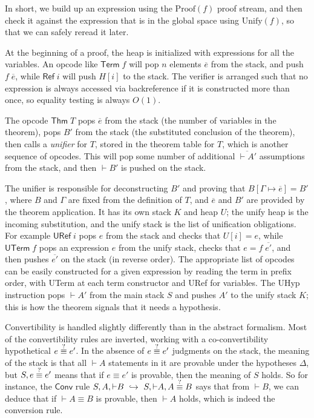 \documentclass[runningheads]{llncs}
\newcommand{\hto}{\hookrightarrow}
\newcommand{\coconv}{\mathrel{\smash{\overset{?}{\equiv}}}}
\begin{document}
In short, we build up an expression using the $\mathrm{Proof}(f)$ proof stream, and then check it against the expression that is in the global space using $\mathrm{Unify}(f)$, so that we can safely reread it later.

At the beginning of a proof, the heap is initialized with expressions for all the variables. An opcode like $\mathsf{Term}\;f$ will pop $n$ elements $\overline{e}$ from the stack, and push $f\;\overline{e}$, while $\mathsf{Ref}\;i$ will push $H[i]$ to the stack. The verifier is arranged such that no expression is always accessed via backreference if it is constructed more than once, so equality testing is always $O(1)$.

The opcode $\mathsf{Thm}\;T$ pops $\overline{e}$ from the stack (the number of variables in the theorem), pops $B'$ from the stack (the substituted conclusion of the theorem), then calls a \emph{unifier} for $T$, stored in the theorem table for $T$, which is another sequence of opcodes. This will pop some number of additional $\overline{\vdash A'}$ assumptions from the stack, and then $\vdash B'$ is pushed on the stack.

The unifier is responsible for deconstructing $B'$ and proving that $B[\Gamma\mapsto \overline{e}]=B'$, where $B$ and $\Gamma$ are fixed from the definition of $T$, and $\overline{e}$ and $B'$ are provided by the theorem application. It has its own stack $K$ and heap $U$; the unify heap is the incoming substitution, and the unify stack is the list of unification obligations. For example $\mathsf{URef}\;i$ pops $e$ from the stack and checks that $U[i]=e$, while $\mathsf{UTerm}\;f$ pops an expression $e$ from the unify stack, checks that $e=f\;\overline{e'}$, and then pushes $\overline{e'}$ on the stack (in reverse order). The appropriate list of opcodes can be easily constructed for a given expression by reading the term in prefix order, with \textsf{UTerm} at each term constructor and \textsf{URef} for variables. The \textsf{UHyp} instruction pops $\vdash A'$ from the main stack $S$ and pushes $A'$ to the unify stack $K$; this is how the theorem signals that it needs a hypothesis.

Convertibility is handled slightly differently than in the abstract formalism. Most of the convertibility rules are inverted, working with a co-convertibility hypothetical $e\coconv e'$. In the absence of $e\coconv e'$ judgments on the stack, the meaning of the stack is that all $\vdash A$ statements in it are provable under the hypotheses $\Delta$, but $S,e\coconv e'$ means that if $e\equiv e'$ is provable, then the meaning of $S$ holds. So for instance, the $\mathsf{Conv}$ rule $S,A,{{\vdash} B}\ \hto\ S,{{\vdash} A},A\coconv B$ says that from $\vdash B$, we can deduce that if $\vdash A\equiv B$ is provable, then $\vdash A$ holds, which is indeed the conversion rule.
\end{document}
